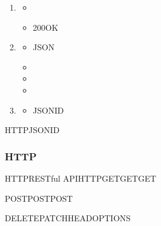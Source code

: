 
\begin{enumerate}
\def\labelenumi{\arabic{enumi}.}
\item
  \important{}

  \begin{itemize}
  \item
  \item
    200OK
  \end{itemize}
\item
  \important{}

  \begin{itemize}
  \item
    JSON
  \item
  \item
  \item
  \end{itemize}
\item
  \important{}

  \begin{itemize}
  \tightlist
  \item
    JSONID
  \end{itemize}
\end{enumerate}

HTTPJSONID

\hypertarget{http-3}{%
\subsubsection{HTTP}\label{http-3}}

HTTPRESTful APIHTTP\important{}\important{}GETGETGET

\important{}POSTPOSTPOST

\important{}DELETEPATCHHEADOPTIONS

